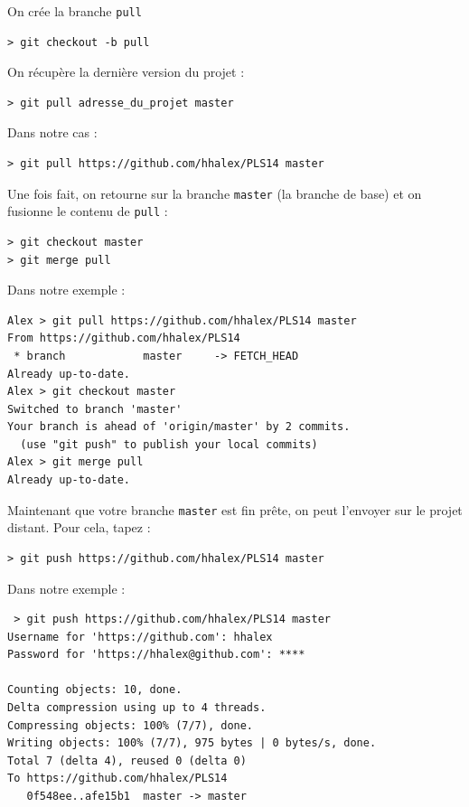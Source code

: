 \par On crée la branche \texttt{pull}
\begin{verbatim}
> git checkout -b pull
\end{verbatim}

\par On récupère la dernière version du projet :
\begin{verbatim}
> git pull adresse_du_projet master
\end{verbatim}

\par Dans notre cas :
\begin{verbatim}
> git pull https://github.com/hhalex/PLS14 master
\end{verbatim}

\par Une fois fait, on retourne sur la branche \texttt{master} (la branche de base) et on fusionne le contenu de \texttt{pull} :

\begin{verbatim}
> git checkout master
> git merge pull
\end{verbatim}

\par Dans notre exemple :

\begin{verbatim}
Alex > git pull https://github.com/hhalex/PLS14 master
From https://github.com/hhalex/PLS14
 * branch            master     -> FETCH_HEAD
Already up-to-date.
Alex > git checkout master
Switched to branch 'master'
Your branch is ahead of 'origin/master' by 2 commits.
  (use "git push" to publish your local commits)
Alex > git merge pull
Already up-to-date.
\end{verbatim}

\par Maintenant que votre branche \texttt{master} est fin prête, on peut l'envoyer sur le projet distant. Pour cela, tapez :

\begin{verbatim}
> git push https://github.com/hhalex/PLS14 master
\end{verbatim}

\par Dans notre exemple :
\begin{verbatim}
 > git push https://github.com/hhalex/PLS14 master
Username for 'https://github.com': hhalex
Password for 'https://hhalex@github.com': ****

Counting objects: 10, done.
Delta compression using up to 4 threads.
Compressing objects: 100% (7/7), done.
Writing objects: 100% (7/7), 975 bytes | 0 bytes/s, done.
Total 7 (delta 4), reused 0 (delta 0)
To https://github.com/hhalex/PLS14
   0f548ee..afe15b1  master -> master
\end{verbatim}

